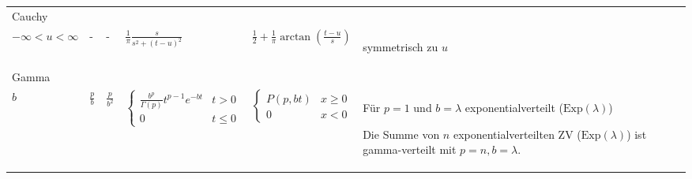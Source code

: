\documentclass[a4paper,10pt]{article}
\begin{document}
\begin{center}
\begin{tabularx}{\textwidth}{llXXXXXX}
		Cauchy                   & \makecell[l]{\( s > 0 \)                                                                                                                                                                                                                                                                                                                                                                                                                                                                                                                                                                 \\ \( -\infty < u < \infty \)} & - & - & $\frac{1}{\pi} \frac{s}{s^2 + (t - u)^2}$ & $\frac{1}{2} + \frac{1}{\pi} \arctan \left( \frac{t - u}{s} \right)$ & \begin{rowlist}
			\item symmetrisch zu $u$
		\end{rowlist} \\

		Gamma                    & \makecell[l]{\( p \)                                                                                                                                                                                                                                                                                                                                                                                                                                                                                                                                                                     \\ \( b \)} & $\frac{p}{b}$ & $\frac{p}{b^2}$ & $\begin{cases}
				\frac{b^p}{\Gamma(p)} t^{p - 1} e^{-bt} & t > 0    \\
				0                                       & t \leq 0
			\end{cases}$ & $\begin{cases}
				P(p, bt) & x \geq 0 \\
				0        & x < 0
			\end{cases}$ & \begin{rowlist}
				\item Für $p = 1$ und $b = \lambda$ exponentialverteilt ($\text{Exp}(\lambda)$)
				\item Die Summe von $n$ exponentialverteilten ZV ($\text{Exp}(\lambda)$) ist gamma-verteilt mit $p = n, b = \lambda$.
			\end{rowlist} \\

		\bottomrule
	\end{tabularx}
\end{center}
\end{document}
